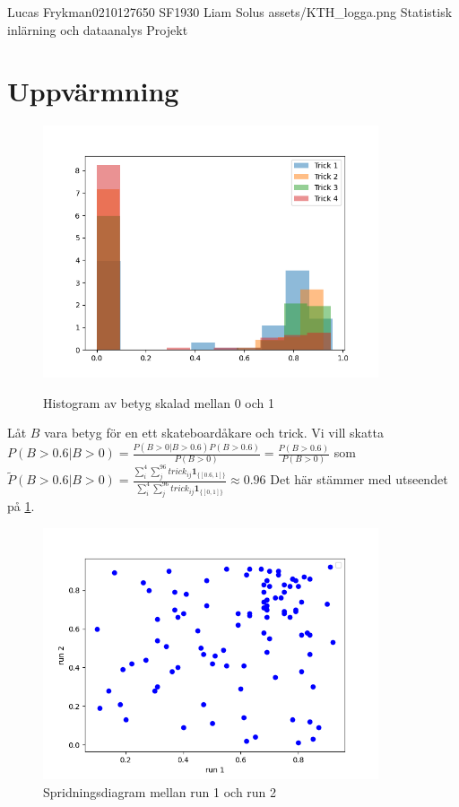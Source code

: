 \documentclass{assignment}
\newcommand{\indicator}[1]{\mathbf{1}_{\{#1\}}}
\begin{document}
\assignmentTitle
{Lucas Frykman}{0210127650}
{SF1930}
{Liam Solus}
{assets/KTH_logga.png}
{Statistisk inlärning och dataanalys}
{Projekt}


\section{Uppvärmning}

\begin{figure}[!h]
    \caption{Histogram av betyg skalad mellan 0 och 1}
    \begin{center}
        \includegraphics[width = 99mm]{assets/Figure_2.png} \label{Histogram 1}
    \end{center}
\end{figure}


Låt $B$ vara betyg för en ett skateboardåkare och trick. Vi vill skatta $P(B>0.6|B>0) = \frac{P(B>0|B>0.6)P(B>0.6)}{P(B>0)}=\frac{P(B>0.6)}{P(B>0)}$
som $\tilde{P}(B>0.6|B>0) = \frac{\sum_{i}^4\sum_{j}^{96}trick_{ij}\indicator{[0.6,1]}}{\sum_{i}^4\sum_{j}^{96}trick_{ij}\indicator{[0,1]}} \approx 0.96$
Det här stämmer med utseendet på \cref{Histogram 1}.

\begin{figure}[!h]
    \caption{Spridningsdiagram mellan run 1 och run 2}
    \begin{center}
        \includegraphics[width = 99mm]{assets/Figure_1.png}
    \end{center}
\end{figure}
\end{document}
